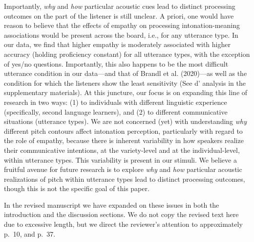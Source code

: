 \documentclass[]{article}
\newcommand{\TaskEstimationBox}[2]{%
\ifoptiondraft{\parbox{1.0\linewidth}{\hfill \hfill {\colorbox{#2}{\color{White} \textbf{#1}}}}}%
{}%
}
\def\Done {\TaskEstimationBox{Done}{Blue}}
\def\Easy {\TaskEstimationBox{Feasible}{ForestGreen}}
\begin{document}
Importantly, \emph{why} and \emph{how} particular acoustic cues lead to distinct processing outcomes on the part of the listener is still unclear.
A priori, one would have reason to believe that the effects of empathy on processing intonation-meaning associations would be present across the board, i.e., for any utterance type.
In our data, we find that higher empathy is moderately associated with higher accuracy (holding proficiency constant) for all utterance types, with the exception of yes/no questions.
Importantly, this also happens to be the most difficult utterance condition in our data---and that of Brandl et al. (2020)---as well as the condition for which the listeners show the least sensitivity (See d' analysis in the supplementary materials).
At this juncture, our focus is on expanding this line of research in two ways: (1) to individuals with different linguistic experience (specifically, second language learners), and (2) to different communicative situations (utterance types).
We are not concerned (yet) with understanding \emph{why} different pitch contours affect intonation perception, particularly with regard to the role of empathy, because there is inherent variability in how speakers realize their communicative intentions, at the variety-level and at the individual-level, within utterance types.
This variability is present in our stimuli.
We believe a fruitful avenue for future research is to explore \emph{why} and \emph{how} particular acoustic realizations of pitch within utterance types lead to distinct processing outcomes, though this is not the specific goal of this paper.

In the revised manuscript we have expanded on these issues in both the introduction and the discussion sections.
We do not copy the revised text here due to excessive length, but we direct the reviewer's attention to approximately p.~10, and p.~37.

\Done
\Easy

\end{document}
